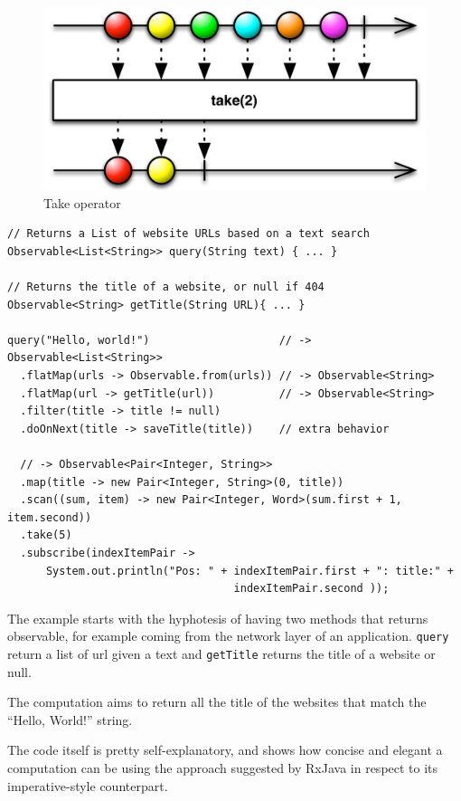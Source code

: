 \begin{figure}[htbp]
\centering
\includegraphics[scale=0.5]{imgs/take.png}
\caption{Take operator}
\end{figure}

\label{a-complex-example}

\begin{verbatim}
// Returns a List of website URLs based on a text search
Observable<List<String>> query(String text) { ... }

// Returns the title of a website, or null if 404
Observable<String> getTitle(String URL){ ... }

query("Hello, world!")                    // -> Observable<List<String>>
  .flatMap(urls -> Observable.from(urls)) // -> Observable<String>
  .flatMap(url -> getTitle(url))          // -> Observable<String>
  .filter(title -> title != null)
  .doOnNext(title -> saveTitle(title))    // extra behavior
  
  // -> Observable<Pair<Integer, String>>
  .map(title -> new Pair<Integer, String>(0, title)) 
  .scan((sum, item) -> new Pair<Integer, Word>(sum.first + 1, item.second))
  .take(5)
  .subscribe(indexItemPair ->
      System.out.println("Pos: " + indexItemPair.first + ": title:" + 
      							   indexItemPair.second ));
\end{verbatim}

The example starts with the hyphotesis of having two methods that
returns observable, for example coming from the network layer of an
application. \texttt{query} return a list of url given a text and
\texttt{getTitle} returns the title of a website or null.

The computation aims to return all the title of the websites that match
the ``Hello, World!'' string.

The code itself is pretty self-explanatory, and shows how concise and
elegant a computation can be using the approach suggested by RxJava in
respect to its imperative-style counterpart.

